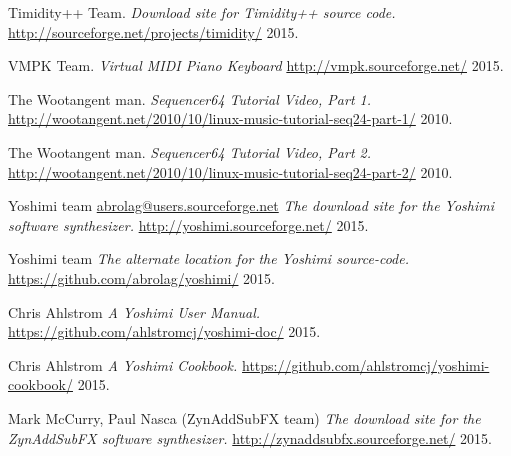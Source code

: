 \begin{thebibliography}{99}
   Timidity++ Team.
   \emph{Download site for Timidity++ source code.}
   \url{http://sourceforge.net/projects/timidity/}
   2015.

   VMPK Team.
   \emph{Virtual MIDI Piano Keyboard}
   \url{http://vmpk.sourceforge.net/}
   2015.

   The Wootangent man.
   \emph{Sequencer64 Tutorial Video, Part 1.}
   \url{http://wootangent.net/2010/10/linux-music-tutorial-seq24-part-1/}
   2010.

   The Wootangent man.
   \emph{Sequencer64 Tutorial Video, Part 2.}
   \url{http://wootangent.net/2010/10/linux-music-tutorial-seq24-part-2/}
   2010.

   Yoshimi team \url{abrolag@users.sourceforge.net}
   \emph{The download site for the Yoshimi software synthesizer.}
   \url{http://yoshimi.sourceforge.net/}
   2015.

   Yoshimi team
   \emph{The alternate location for the Yoshimi source-code.}
   \url{https://github.com/abrolag/yoshimi/}
   2015.

   Chris Ahlstrom
   \emph{A Yoshimi User Manual.}
   \url{https://github.com/ahlstromcj/yoshimi-doc/}
   2015.

   Chris Ahlstrom
   \emph{A Yoshimi Cookbook.}
   \url{https://github.com/ahlstromcj/yoshimi-cookbook/}
   2015.

   Mark McCurry, Paul Nasca (ZynAddSubFX team)
   \emph{The download site for the ZynAddSubFX software synthesizer.}
   \url{http://zynaddsubfx.sourceforge.net/}
   2015.

\end{thebibliography}

